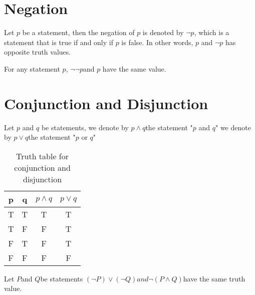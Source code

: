 \documentclass{book}
\numberwithin{equation}{section}
\begin{document}
\section{Negation}
\begin{definitionenv}
    Let $p$ be a statement, then the negation of $p$ is denoted by $\neg p$, which is a statement that is true if and only if $p$ is false.
    In other words, $p$ and $\neg p$ has opposite truth values.
\end{definitionenv}
\begin{propositionenv}
For any statement $p$, $\neg \neg p$and $p$ have the same value.
\end{propositionenv}





\section{Conjunction and Disjunction}
\begin{definitionenv}
    Let $p$ and $q$ be statements,
    \newline
    we denote by $p\wedge q $the statement "$p$ and $q$"
    \newline
    we denote by $p\vee q $the statement "$p$ or $q$"
    
\end{definitionenv}

\begin{table}
    \begin{center}
\begin{tabular}{c|c|c|c}
    p & q & $p\wedge q$ & $p\vee q$ \\
    \hline
    T & T & T & T \\
    T & F & F & T \\
    F & T & F & T \\
    F & F & F & F \\    

\end{tabular}
\caption{Truth table for conjunction and disjunction} 
\end{center}
\end{table}

\begin{propositionenv}
    Let $P$and $Q$be statements $(\neg P)\vee (\neg Q)and \neg(P\wedge Q)$have the same truth value.
\end{propositionenv}
\end{document}
